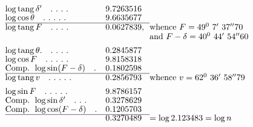 \[
\renewcommand{\arraystretch}{.87}
\begin{array}{@{}l@{\quad}r@{}l@{\hspace{.65em}}l@{}}
\log\operatorname{tang}\delta'\quad .\ .\ .\ .&9.7263516&&\\
\log\cos\theta\quad .\ .\ .\ .\ .&9.6635677&&\\\cline{1-3}
\log\operatorname{tang}F\quad .\ .\ .\ .&0.0627839&,&\text{whence }F=49^0\ 7'\ 37''70\\
&&&\text{and }F-\delta=40^0\ 44'\ 54''60\\[6pt]
\log\operatorname{tang}\theta.\quad .\ .\ .\ .&0.2845877&&\\
\log\cos F\quad .\ .\ .\ .\ .&9.8158318&&\\
\text{Comp. }\log\sin(F-\delta)\quad .&0.1802598&&\\\cline{1-3}
\log\operatorname{tang}v\quad .\ .\ .\ .\ .&0.2856793&&\text{whence }v=62^0\ 36'\ 58''79\\[6pt]
\log\sin F\quad .\ .\ .\ .\ .&9.8786157&&\\
\text{Comp. }\log\sin\delta'\quad .\ .\ .&0.3278629&&\\
\text{Comp. }\log\cos(F-\delta)\quad .&0.1205703&&\\\cline{1-3}
&0.3270489&&=\log 2.123483=\log n
\end{array}
\]
\endgroup
